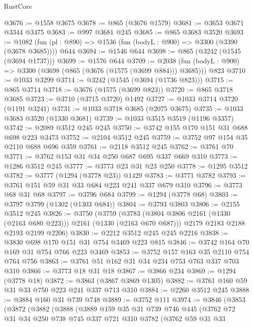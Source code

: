 \begin{lexlean}{RustCore}
\begin{coremodule}
@3676 := @1558 @3675
@3678 := @865 (@3676 @1579)
@3681 := @3653 @3671 @3344 @3475
@3683 := @997 @3681 @245
@3685 := @865 @3683 @3520
@3693 := @1082 (fun (pl : @890) => @1536 (fun (bodyL : @900) => @3300 (@3390 (@3678 @3685)))) @644
@3694 := @1546 @644
@3698 := @865 (@3242 (@1545 (@3694 @1737)))
@3699 := @1576 @644
@3709 := @2038 (fun (bodyL : @900) => @3300 (@3698 (@865 (@3676 (@1575 (@3699 @884))) @3685))) @823
@3710 := @1033 @3299
@3714 := @3242 (@1545 (@3694 (@1736 @823)))
@3715 := @865 @3714
@3718 := @3676 (@1575 (@3699 @823))
@3720 := @865 @3718 @3685
@3723 := @3710 (@3715 @3720) @1492
@3727 := @1033 @3714 @3720 (@1191 @3241)
@3731 := @1033 @3718 @3685 (@2075 @3675)
@3735 := @1033 @3683 @3520 (@1330 @3681)
@3739 := @1033 @3515 @3519 (@1196 @3357)
@3742 := @2089 @3512 @245 @245
@3750 := @3742 @155 @170 @151 @31 @688 @698 @223 @3473
@3752 := @2104 @3512 @245
@3759 := @3752 @97 @154 @35 @2110 @688 @696 @359
@3761 := @2118 @3512 @245
@3762 := @3761 @70
@3771 := @3762 @153 @31 @34 @250 @687 @695 @337 @669 @310
@3773 := @1286 @3512 @245
@3777 := @3773 @23 @31 @23 @250
@3778 := @1295 @3512
@3782 := @3777 (@1294 (@3778 @23)) @1429
@3783 := @3771 @3782
@3793 := @3761 @151 @59 @31 @33 @684 @223 @241 @337 @679 @310
@3796 := @3773 @68 @31 @68
@3797 := @3796 @684
@3799 := @1294 (@3778 @68)
@3803 := @3797 @3799 (@1302 (@1303 @684))
@3804 := @3793 @3803
@3806 := @2155 @3512 @245
@3826 := @3750
    (@3759
      (@3783 (@3804 @3806 @2161 (@1330 (@2163 @680 @223))) @2161 (@1330 (@2163 @670 @687)))
      @2179
      @2183
      @2188
      @2193
      @2199
      @2206)
@3830 := @2212 @3512 @245 @245 @2216
@3838 := @3830 @698 @170 @151 @31 @754 @3469 @223 @815
@3846 := @3742 @164 @70 @169 @31 @754 @766 @223 @3469
@3853 := @3752 @157 @163 @35 @2110 @754 @764 @756
@3863 := @3761 @51 @162 @31 @34 @234 @753 @763 @337 @703 @310
@3866 := @3773 @18 @31 @18
@3867 := @3866 @234
@3869 := @1294 (@3778 @18)
@3872 := @3863 (@3867 @3869 @1305)
@3882 := @3761 @160 @59 @31 @33 @750 @223 @241 @337 @713 @310
@3884 := @2260 @3512 @245
@3888 := @3884 @160 @31 @739 @748
@3889 := @3752 @111
@3974 := @3846
    (@3853
      (@3872
        (@3882
          (@3888
            (@3889
              @159
              @35
              @31
              @739
              @746
              @445
              (@3762
                @72
                @31
                @34
                @250
                @738
                @745
                @337
                @721
                @310
                @3782
                (@3762
                  @59
                  @31
                  @33

\end{coremodule}
\end{lexlean}

